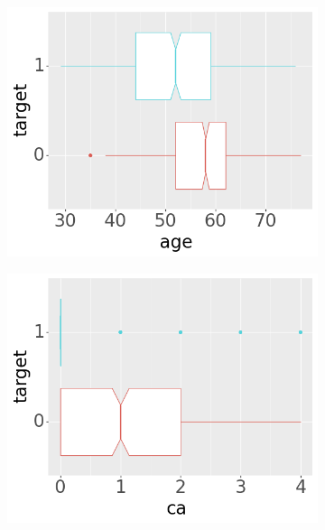 \begin{figure}[btp]
     \centering
     \begin{subfigure}[b]{0.32\textwidth}
         \centering
         \includegraphics[width=\textwidth]{plots/target-age}
     \end{subfigure}
     \begin{subfigure}[b]{0.32\textwidth}
         \centering
         \includegraphics[width=\textwidth]{plots/target-ca}
     \end{subfigure}
     \begin{subfigure}[b]{0.32\textwidth}
         \centering

\end{subfigure}
\end{figure}
